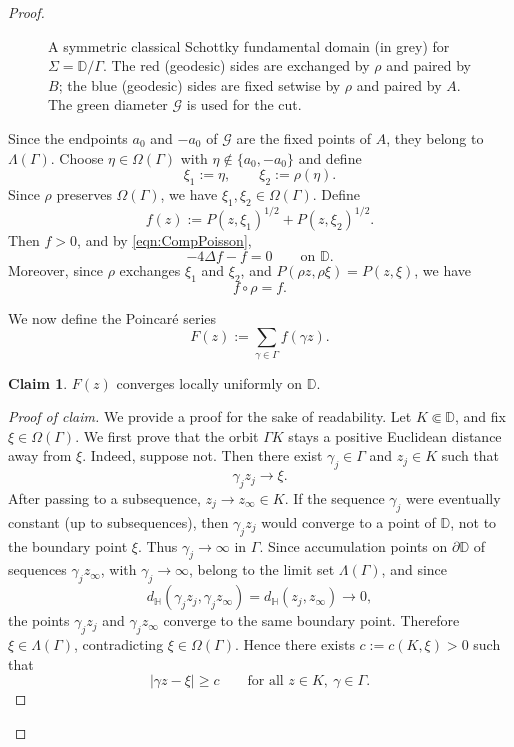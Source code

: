 \documentclass[12pt,a4paper,reqno]{amsart}
\theoremstyle{definition}
\newtheorem*{claim}{Claim}
\renewcommand{\geq}{\geqslant}
\begin{document}
{\begin{proof}
\begin{figure}[htbp]
\caption{A symmetric classical Schottky fundamental domain (in grey)
for $\Sigma=\mathbb D/\Gamma$. The red (geodesic) sides are exchanged by
$\rho$ and paired by $B$; the blue (geodesic) sides are fixed setwise by $\rho$
and paired by $A$. The green diameter $\mathcal{G}$ is used for the cut.}
\label{fig:schottky-domain}
\end{figure}

Since the endpoints $a_0$ and $-a_0$ of $\mathcal G$ are the fixed points of
$A$, they belong to $\Lambda(\Gamma)$. Choose
$
\eta\in \Omega(\Gamma)
$
with $\eta\notin\{a_0,-a_0\}$ 
and define
\[
\xi_1:=\eta,
\qquad
\xi_2:=\rho(\eta).
\]
Since $\rho$ preserves $\Omega(\Gamma)$, we have $
\xi_1,\xi_2\in\Omega(\Gamma)$.
Define
\[
f(z):=P(z,\xi_1)^{1/2}+P(z,\xi_2)^{1/2}.
\]
Then $f>0$, and by \eqref{eqn:CompPoisson},
\[
-4\Delta f-f=0
\qquad
\text{on } \mathbb D.
\]
Moreover, since $\rho$ exchanges $\xi_1$ and $\xi_2$, and $P(\rho z,\rho\xi)=P(z,\xi)$, we have
\[
f\circ\rho=f.
\]

We now define the Poincaré series
\begin{equation}\label{eqn:PoincareSeries}
F(z):=\sum_{\gamma\in\Gamma} f(\gamma z).
\end{equation}
\begin{claim}
    $F(z)$ converges locally uniformly on $\mathbb D$. 
\end{claim}
\begin{proof}[Proof of claim]
We provide a proof for the sake of readability. Let
$K\Subset\mathbb D$, and fix
$\xi\in\Omega(\Gamma)$. We first prove that the orbit $\Gamma K$ stays a
positive Euclidean distance away from $\xi$. Indeed, suppose not. Then there
exist $\gamma_j\in\Gamma$ and $z_j\in K$ such that
\[
\gamma_j z_j\to \xi.
\]
After passing to a subsequence, $z_j\to z_\infty\in K$. If the sequence
$\gamma_j$ were eventually constant (up to subsequences), then $\gamma_j z_j$ would converge to
a point of $\mathbb D$, not to the boundary point $\xi$. Thus
$\gamma_j\to\infty$ in $\Gamma$. Since accumulation points on
$\partial\mathbb D$ of sequences $\gamma_j z_\infty$, with
$\gamma_j\to\infty$, belong to the limit set $\Lambda(\Gamma)$, and since
\[
d_{\mathbb H}(\gamma_j z_j,\gamma_j z_\infty)
=
d_{\mathbb H}(z_j,z_\infty)\to 0,
\]
the points $\gamma_j z_j$ and $\gamma_j z_\infty$ converge to the same
boundary point. Therefore $\xi\in\Lambda(\Gamma)$, contradicting
$\xi\in\Omega(\Gamma)$. Hence there exists $c:=c(K,\xi)>0$ such that
\[
|\gamma z-\xi|\geq c
\qquad
\text{for all } z\in K,\ \gamma\in\Gamma.
\]


\end{proof}
\end{proof}}
\end{document}
